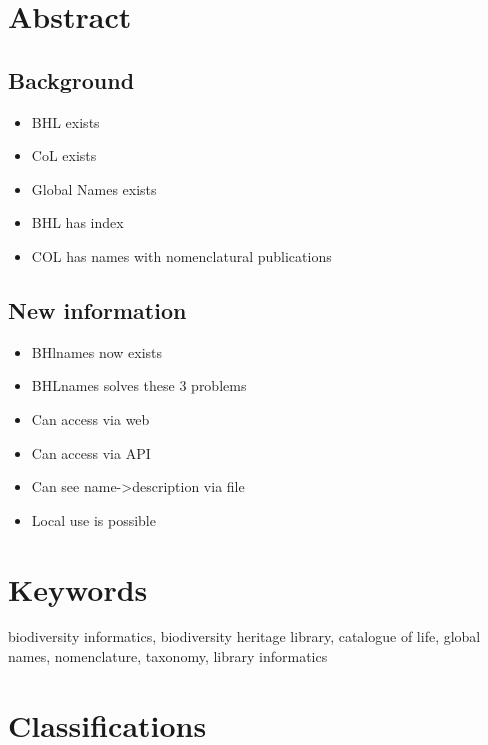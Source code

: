 \documentclass[
]{article}
\providecommand{\tightlist}{%
  \setlength{\itemsep}{0pt}\setlength{\parskip}{0pt}}
\begin{document}
\hypertarget{abstract}{%
\section{Abstract}\label{abstract}}

\hypertarget{background}{%
\subsection{Background}\label{background}}

\begin{itemize}
\tightlist
\item
  BHL exists
\item
  CoL exists
\item
  Global Names exists
\item
  BHL has index
\item
  COL has names with nomenclatural publications
\end{itemize}

\hypertarget{new-information}{%
\subsection{New information}\label{new-information}}

\begin{itemize}
\tightlist
\item
  BHlnames now exists
\item
  BHLnames solves these 3 problems
\item
  Can access via web
\item
  Can access via API
\item
  Can see name-\textgreater description via file
\item
  Local use is possible
\end{itemize}

\hypertarget{keywords}{%
\section{Keywords}\label{keywords}}

biodiversity informatics, biodiversity heritage library, catalogue of
life, global names, nomenclature, taxonomy, library informatics

\hypertarget{classifications}{%
\section{Classifications}\label{classifications}}
\end{document}
